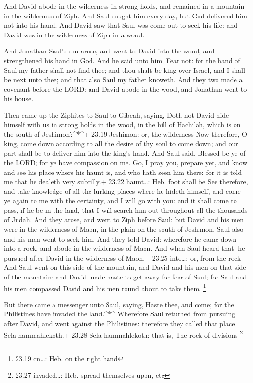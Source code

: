  And David abode in the wilderness in strong holds, and
remained in a mountain in the wilderness of Ziph. And Saul sought him
every day, but God delivered him not into his hand.  And
David saw that Saul was come out to seek his life: and David was in the
wilderness of Ziph in a wood.

 And Jonathan Saul's son arose, and went to David into the
wood, and strengthened his hand in God.  And he said unto
him, Fear not: for the hand of Saul my father shall not find thee; and
thou shalt be king over Israel, and I shall be next unto thee; and that
also Saul my father knoweth.  And they two made a covenant
before the LORD: and David abode in the wood, and Jonathan went to his
house.

 Then came up the Ziphites to Saul to Gibeah, saying, Doth
not David hide himself with us in strong holds in the wood, in the hill
of Hachilah, which is on the south of Jeshimon?\^{}*\^{}+ 23.19
Jeshimon: or, the wilderness  Now therefore, O king, come
down according to all the desire of thy soul to come down; and our part
shall be to deliver him into the king's hand.  And Saul
said, Blessed be ye of the LORD; for ye have compassion on me.
 Go, I pray you, prepare yet, and know and see his place
where his haunt is, and who hath seen him there: for it is told me that
he dealeth very subtilly.+ 23.22 haunt\ldots: Heb. foot shall be
 See therefore, and take knowledge of all the lurking
places where he hideth himself, and come ye again to me with the
certainty, and I will go with you: and it shall come to pass, if he be
in the land, that I will search him out throughout all the thousands of
Judah.  And they arose, and went to Ziph before Saul: but
David and his men were in the wilderness of Maon, in the plain on the
south of Jeshimon.  Saul also and his men went to seek him.
And they told David: wherefore he came down into a rock, and abode in
the wilderness of Maon. And when Saul heard that, he pursued after David
in the wilderness of Maon.+ 23.25 into\ldots: or, from the rock
 And Saul went on this side of the mountain, and David and
his men on that side of the mountain: and David made haste to get away
for fear of Saul; for Saul and his men compassed David and his men round
about to take them. \footnote{23.19 on\ldots: Heb. on the right hand}

 But there came a messenger unto Saul, saying, Haste thee,
and come; for the Philistines have invaded the land.\^{}*\^{}
 Wherefore Saul returned from pursuing after David, and
went against the Philistines: therefore they called that place
Sela-hammahlekoth.+ 23.28 Sela-hammahlekoth: that is, The rock of
divisions \footnote{23.27 invaded\ldots: Heb. spread themselves upon,
  etc}

